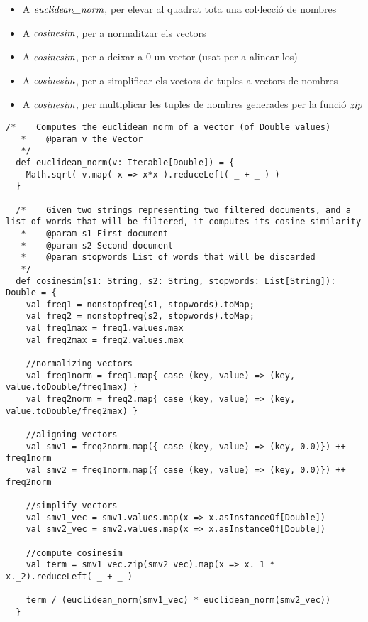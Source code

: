 \documentclass{report}
\begin{document}
\begin{itemize}
  \item A $\emph{euclidean\_norm}$, per elevar al quadrat tota una col$ \cdot $lecció de nombres
  \item A $\emph{cosinesim}$, per a normalitzar els vectors
  \item A $\emph{cosinesim}$, per a deixar a 0 un vector (usat per a alinear-los)
  \item A $\emph{cosinesim}$, per a simplificar els vectors de tuples a vectors de nombres
  \item A $\emph{cosinesim}$, per multiplicar les tuples de nombres generades per la funció $\emph{zip}$
\end{itemize}

\newpage

\begin{lstlisting}[style=scalaHighlight]
  /*	Computes the euclidean norm of a vector (of Double values)
   *	@param v the Vector
   */
  def euclidean_norm(v: Iterable[Double]) = {
    Math.sqrt( v.map( x => x*x ).reduceLeft( _ + _ ) )
  }

  /*	Given two strings representing two filtered documents, and a list of words that will be filtered, it computes its cosine similarity
   * 	@param s1 First document
   * 	@param s2 Second document
   * 	@param stopwords List of words that will be discarded
   */
  def cosinesim(s1: String, s2: String, stopwords: List[String]): Double = {
    val freq1 = nonstopfreq(s1, stopwords).toMap;
    val freq2 = nonstopfreq(s2, stopwords).toMap;
    val freq1max = freq1.values.max
    val freq2max = freq2.values.max

    //normalizing vectors
    val freq1norm = freq1.map{ case (key, value) => (key, value.toDouble/freq1max) }
    val freq2norm = freq2.map{ case (key, value) => (key, value.toDouble/freq2max) }

    //aligning vectors
    val smv1 = freq2norm.map({ case (key, value) => (key, 0.0)}) ++ freq1norm
    val smv2 = freq1norm.map({ case (key, value) => (key, 0.0)}) ++ freq2norm

    //simplify vectors
    val smv1_vec = smv1.values.map(x => x.asInstanceOf[Double])
    val smv2_vec = smv2.values.map(x => x.asInstanceOf[Double])

    //compute cosinesim
    val term = smv1_vec.zip(smv2_vec).map(x => x._1 * x._2).reduceLeft( _ + _ )

    term / (euclidean_norm(smv1_vec) * euclidean_norm(smv2_vec))
  }
\end{lstlisting}
\end{document}
